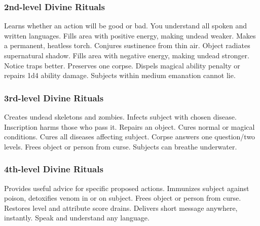\subsubsection{2nd-level Divine Rituals}
\begin{rituallist}
    \M\F Learns whether an action will be good or bad.
     You understand all spoken and written languages.
     Fills area with positive energy, making undead weaker.
     Makes a permanent, heatless torch.
     Conjures sustinence from thin air.
     Object radiates supernatural shadow.
     Fills area with negative energy, making undead stronger.
     Notice traps better.
     Preserves one corpse.
     Dispels magical ability penalty or repairs 1d4 ability damage.
     Subjects within medium emanation cannot lie.
\end{rituallist}

\subsubsection{3rd-level Divine Rituals}
\begin{rituallist}
     Creates undead skeletons and zombies.
     Infects subject with chosen disease.
    \M Inscription harms those who pass it.
     Repairs an object.
     Cures normal or magical conditions.
     Cures all diseases affecting subject.
     Corpse answers one question/two levels.
     Frees object or person from curse.
     Subjects can breathe underwater.
\end{rituallist}

\subsubsection{4th-level Divine Rituals}
\begin{rituallist}
     Provides useful advice for specific proposed actions.
     Immunizes subject against poison, detoxifies venom in or on subject.
     Frees object or person from curse.
     Restores level and attribute score drains.
     Delivers short message anywhere, instantly.
     Speak and understand any language.
\end{rituallist}

